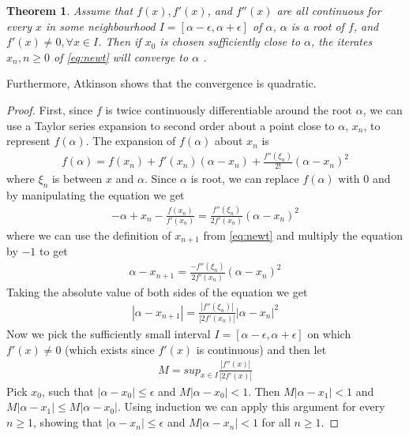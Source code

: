 \documentclass[
  digital, %
  table,   %
  nolof,     %
  nolot,     %
	draft, %
]{fithesis3}
\begin{document}
\newtheorem{theorem}{Theorem}[section] %
\begin{theorem}
  Assume that $f(x), f'(x)$, and $f''(x)$ are all continuous for every $x$ in some neighbourhood $I = [\alpha - \epsilon, \alpha + \epsilon]$ of $\alpha$, $\alpha$ is a root of $f$, and $f'(x) \neq 0, \forall x \in I$. Then if $x_{0}$ is chosen sufficiently close to $\alpha$, the iterates $x_{n}, n \geq 0$ of \eqref{eq:newt} will converge to $\alpha$ \parencite[p.~60]{rootApproxMeth}. 
\end{theorem}
Furthermore, Atkinson\cite{rootApproxMeth} shows that the convergence is quadratic.
\begin{proof}
First, since $f$ is twice continuously differentiable around the root $\alpha$, we can use a Taylor series expansion\parencite[p.~59]{rootApproxMeth} to second order about a point close to $\alpha$, $x_{n}$, to represent $f(\alpha)$. The expansion of $f(\alpha)$ about $x_{n}$ is 
\begin{align}
	f(\alpha) = f(x_{n}) + f'(x_{n})(\alpha - x_{n}) + \frac{f''(\xi_{n})}{2!}(\alpha - x_{n})^2
\end{align}
where $\xi_{n}$ is between $x$ and $\alpha$. Since $\alpha$ is root, we can replace $f(\alpha)$ with $0$ and by manipulating the equation we get
\begin{align}
  -\alpha + x_{n}	- \frac{f(x_{n})}{f'(x_{n})} = \frac{f''(\xi_{n})}{2f'(x_{n})}(\alpha - x_{n})^2
\end{align}
where we can use the definition of $x_{n+1}$ from \eqref{eq:newt} and multiply the equation by $-1$ to get
\begin{align}
  \alpha - x_{n+1} = \frac{-f''(\xi_{n})}{2f'(x_{n})}(\alpha - x_{n})^2 
\end{align}
Taking the absolute value of both sides of the equation we get
\begin{align}
  \left|\alpha - x_{n+1}\right| = \frac{\left|f''(\xi_{n})\right|}{\left|2f'(x_{n})\right|}\left|\alpha - x_{n}\right|^2 
	\label{eq:newtcp}
\end{align}
Now we pick the sufficiently small interval $I = [\alpha - \epsilon, \alpha + \epsilon]$ on which $f'(x) \neq 0$ (which exists since $f'(x)$ is continuous) and then let
\begin{align}
  M = sup_{x\in I}\frac{\left|f''(x)\right|}{\left|2f'(x)\right|}
\end{align}
Pick $x_{0}$, such that $\left|\alpha-x_{0}\right| \leq \epsilon$ and $M\left|\alpha-x_{0}\right| < 1$\parencite[p.~61]{rootApproxMeth}. Then $M\left|\alpha - x_{1}\right| < 1$ and $M\left|\alpha - x_{1}\right| \leq M\left|\alpha - x_{0}\right|$. Using induction we can apply this argument for every $n \geq 1$, showing that $\left|\alpha-x_{n}\right| \leq \epsilon$ and $M\left|\alpha-x_{n}\right| < 1$ for all $n \geq 1$.

\end{proof}
\end{document}
